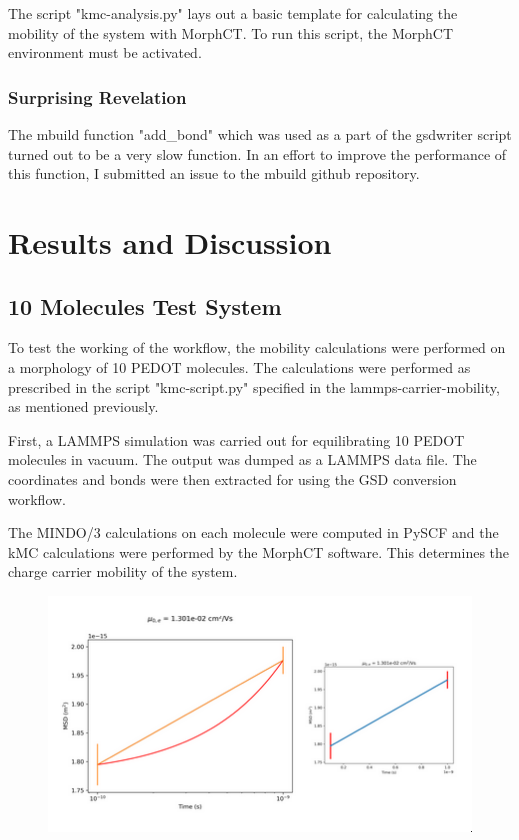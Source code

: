 \documentclass{article}
\begin{document}
The script "kmc-analysis.py" lays out a basic template for calculating the mobility of the system with MorphCT. To run this script, the MorphCT environment must be activated.

\subsubsection*{Surprising Revelation}

The mbuild function "add\_bond" which was used as a part of the gsdwriter script turned out to be a very slow function. In an effort to improve the performance of this function, I submitted an issue to the mbuild github repository.

\section{Results and Discussion}

\subsection{10 Molecules Test System}

To test the working of the workflow, the mobility calculations were performed on a morphology of 10 PEDOT molecules. The calculations were performed as prescribed in the script "kmc-script.py" specified in the lammps-carrier-mobility, as mentioned previously. 

First, a LAMMPS simulation was carried out for equilibrating 10 PEDOT molecules in vacuum. The output was dumped as a LAMMPS data file. The coordinates and bonds were then extracted for using the GSD conversion workflow.

The MINDO/3 calculations on each molecule were computed in PySCF and the kMC calculations were performed by the MorphCT software. This determines the charge carrier mobility of the system.

\begin{figure}
    \centering
    \includegraphics[scale=0.6]{fig5}
\end{figure}




\end{document}
